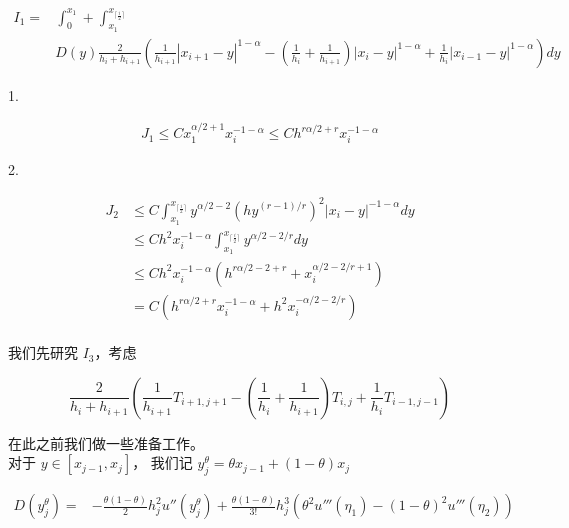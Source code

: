 \documentclass{ctexart}
\begin{document}
\begin{equation}
    \begin{aligned}
        I_1 = & \int_0^{x_1} +\int_{x_1}^{x_{\lceil \frac{i}{2}\rceil}} \\
              & D(y) \frac{2}{h_i + h_{i+1}}
        ( \frac{1}{h_{i+1}} |x_{i+1}-y|^{1-\alpha}
        - (\frac{1}{h_{i}}+\frac{1}{h_{i+1}}) |x_{i}-y|^{1-\alpha}
        +  \frac{1}{h_{i}}|x_{i-1}-y|^{1-\alpha} )  dy
    \end{aligned}
\end{equation}


1.

\begin{equation}
    \begin{aligned}
        J_1 \le C x_1^{\alpha/2+1} x_i^{-1-\alpha} \le C h^{r\alpha/2 +r} x_i^{-1-\alpha}
    \end{aligned}
\end{equation}


2.

\begin{equation}
    \begin{aligned}
        J_2 & \le C \int_{x_1}^{x_{\lceil \frac{i}{2}\rceil}} y^{\alpha/2-2} (h y^{(r-1)/r})^2 |x_i - y|^{-1-\alpha} dy \\
            & \le C h^2 x_i^{-1-\alpha} \int_{x_1}^{x_{\lceil \frac{i}{2}\rceil}} y^{\alpha/2-2/r} dy                   \\
            & \le C h^2 x_i^{-1-\alpha} (h^{r\alpha/2-2+r} + x_i^{\alpha/2-2/r+1})                                      \\
            & = C (h^{r\alpha/2+r} x_i^{-1-\alpha} + h^2x_i^{-\alpha/2-2/r})
    \end{aligned}
\end{equation}
\\

我们先研究 \(I_3\)，考虑

\begin{equation}
    \frac{2}{h_i + h_{i+1}}
    \left( \frac{1}{h_{i+1}} T_{i+1, j+1}
    - (\frac{1}{h_{i}}+\frac{1}{h_{i+1}}) T_{i,j}
    +  \frac{1}{h_{i}} T_{i-1, j-1} \right)
\end{equation}

在此之前我们做一些准备工作。    \\
对于 \(y\in [x_{j-1}, x_j]\)， 我们记 \(y_j^\theta = \theta x_{j-1} + (1-\theta) x_j\)

\begin{equation}
    \begin{aligned}
        D(y_j^\theta) = & -\frac{\theta (1-\theta)}{2} h_j^2 u''(y_j^\theta)
        + \frac{\theta (1-\theta)}{3!} h_j^3 (\theta^2 u'''(\eta_1) - (1-\theta)^2 u'''(\eta_2))
    \end{aligned}
\end{equation}
\end{document}
